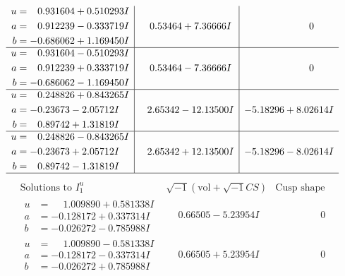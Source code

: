 \documentclass[1p]{elsarticle_modified}
\theoremstyle{definition}
\newcommand{\I}{\sqrt{-1}}
\begin{document}
$$\begin{array}{c|c|c}
\begin{aligned}
u &= \phantom{-}0.931604 + 0.510293 I \\
a &= \phantom{-}0.912239 - 0.333719 I \\
b &= -0.686062 + 1.169450 I\end{aligned}
 & \phantom{-}0.53464 + 7.36666 I & \phantom{-0.000000 } 0 \\ \hline\begin{aligned}
u &= \phantom{-}0.931604 - 0.510293 I \\
a &= \phantom{-}0.912239 + 0.333719 I \\
b &= -0.686062 - 1.169450 I\end{aligned}
 & \phantom{-}0.53464 - 7.36666 I & \phantom{-0.000000 } 0 \\ \hline\begin{aligned}
u &= \phantom{-}0.248826 + 0.843265 I \\
a &= -0.23673 - 2.05712 I \\
b &= \phantom{-}0.89742 + 1.31819 I\end{aligned}
 & \phantom{-}2.65342 - 12.13500 I & -5.18296 + 8.02614 I \\ \hline\begin{aligned}
u &= \phantom{-}0.248826 - 0.843265 I \\
a &= -0.23673 + 2.05712 I \\
b &= \phantom{-}0.89742 - 1.31819 I\end{aligned}
 & \phantom{-}2.65342 + 12.13500 I & -5.18296 - 8.02614 I\\
 \hline 
 \end{array}$$\newpage$$\begin{array}{c|c|c}  
\text{Solutions to }I^u_{1}& \I (\text{vol} + \sqrt{-1}CS) & \text{Cusp shape}\\
 \hline 
\begin{aligned}
u &= \phantom{-}1.009890 + 0.581338 I \\
a &= -0.128172 + 0.337314 I \\
b &= -0.026272 - 0.785988 I\end{aligned}
 & \phantom{-}0.66505 - 5.23954 I & \phantom{-0.000000 } 0 \\ \hline\begin{aligned}
u &= \phantom{-}1.009890 - 0.581338 I \\
a &= -0.128172 - 0.337314 I \\
b &= -0.026272 + 0.785988 I\end{aligned}
 & \phantom{-}0.66505 + 5.23954 I & \phantom{-0.000000 } 0 \\ \hline\begin{aligned}

\end{aligned}
\end{array}$$
\end{document}
